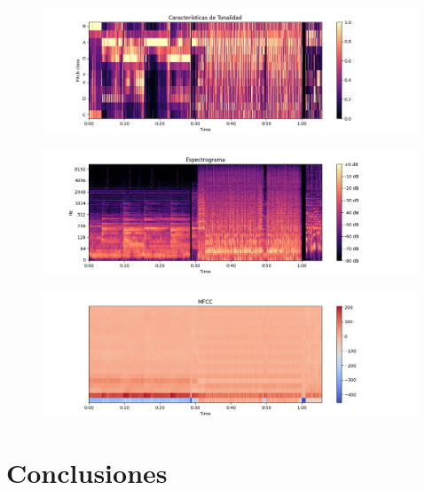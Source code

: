 \documentclass[letterpaper, 12pt]{article}
\begin{document}
\begin{figure}[H]
	\begin{center}
		\includegraphics[width=\linewidth]{Images/testTonality.png}
		\caption{}
	\end{center}
\end{figure}

\begin{figure}[H]
	\begin{center}
		\includegraphics[width=\linewidth]{Images/testSpectogram.png}
		\caption{}
	\end{center}
\end{figure}

\begin{figure}[H]
	\begin{center}
		\includegraphics[width=\linewidth]{Images/testMFCC.png}
		\caption{}
	\end{center}
\end{figure}

\section*{Conclusiones}
\end{document}
